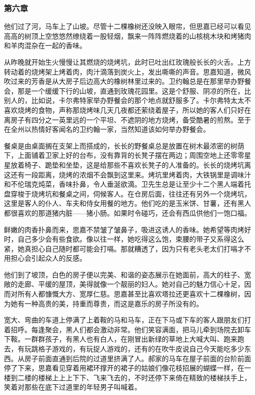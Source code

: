 \subsubsection{第六章}

\par 他们过了河，马车上了山坡。尽管十二棵橡树还没映入眼帘，但思嘉已经可以看见高高的树顶上空悠悠然缭绕着一股轻烟，飘来一阵阵燃烧着的山核桃木块和烤猪肉和羊肉混杂在一起的香味。
\par 从昨晚就开始生火慢慢让其燃烧的烧烤坑，此时已吐出红玫瑰般长长的火舌。上方转动着的烧烤架上烤着肉，肉汁滴落到炭火上，发出嘶嘶的声音。思嘉知道，微风吹过来的芳香是从大房子后边高大的橡树林里过来的。卫约翰总是在那里举办野餐会，那是一个缓缓下行的山坡，直通到玫瑰花园里。这是个舒服、阴凉的所在，比别人的，比如说，卡尔弗特家举办野餐会的那个地点就舒服多了。卡尔弗特太太不喜欢烧烤的食物，声称那烧烤味几天几夜都还萦绕着屋子，所以她的客人们只好在离房子有四分之一英里远的一个平坦、不遮阴的地方烧烤，备受酷暑的煎熬。至于在全州以热情好客闻名的卫约翰一家，当然知道该如何举办野餐会。
\par 餐桌是由桌面搁在支架上而搭成的，长长的野餐桌总是放置在树木最浓密的树荫下，上面铺着卫家上好的台布，没有靠背的长凳子摆在两边；周围空地上还零零星星放着椅子、跪垫和坐垫，这是给那些不喜欢长凳子的人准备的。长长的烧烤坑离这还有一段距离，烧烤的浓烟不会飘到这里来。烤坑里烤着肉，大铁锅里是调味汁和不伦瑞克炖菜，香味扑鼻，令人垂涎欲滴。卫先生总是让至少十二个黑人端着托盘穿梭于烧烤坑和餐桌之间，伺候客人。在仓房后面，往往还有另外一个烧烤坑，这里是客人的仆人、车夫和侍女用餐的地方。他们吃的是玉米饼、甘薯，还有黑人都很喜欢的那道猪内脏——猪小肠。如果时令碰巧，还会有西瓜供他们一饱口福。
\par 鲜嫩的肉香扑鼻而来，思嘉不禁皱了皱鼻子，吸进这诱人的香味。她希望等肉烤好时，自己多少会有些食欲。像以往一样，她吃得这么饱，束腰的带子又系得这么紧，她真担心自己随时都可能会打嗝。那就糟透了，因为只有老头老太们打嗝才不用担心会引起众人的反感。
\par 他们到了坡顶，白色的房子便以完美、和谐的姿态展示在她面前，高大的柱子、宽敞的走廊、平缓的屋顶，美得就像一个靓丽的妇人。她对自己的魅力信心十足，因而对所有人都慷慨大方、宽厚仁慈。思嘉甚至比喜欢塔拉还更喜欢十二棵橡树，因为她有一种高贵的美，持重而尊贵，而这是嘉乐的房子所没有的。
\par 宽大、弯曲的车道上停满了上着鞍的马和马车，正在下马或下车的客人跟朋友们打着招呼。每逢聚会，黑人们都会激动非常。他们笑容满面，把马儿牵到场院去卸车下鞍。一群群孩子，有黑人也有白人，在刚冒出新绿的草地上大喊大叫、跑来跑去，有玩跳格子游戏的，有玩捉人游戏的，还有的在吹牛皮说自己今天能吃多少东西。从房子前面直通到后院的过道里挤满了人。郝家的马车在屋子前面的台阶前面停了下来，思嘉看见穿着用裙环撑开的裙子的姑娘们像花枝招展的蝴蝶一样，在一楼到二楼的楼梯上上上下下、飞来飞去的，不时还停下来倚在精致的楼梯扶手上，笑着对那些在底下过道里的年轻男子叫喊着。
